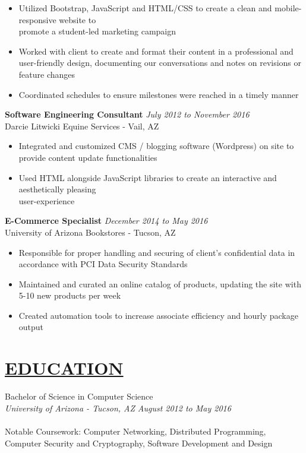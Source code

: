 \documentclass[10pt]{res} %
\begin{document}
\begin{resume}
   \begin{itemize} %
   \item Utilized Bootstrap, JavaScript and HTML/CSS to create a clean and mobile-responsive website to \\ promote a student-led marketing campaign
   \item Worked with client to create and format their content in a professional and user-friendly design, documenting our conversations and notes on revisions or feature changes
   \item Coordinated schedules to ensure milestones were reached in a timely manner
   \end{itemize}

  {\bf Software Engineering Consultant} \hfill  {\sl July 2012 to November 2016}\\
  Darcie Litwicki Equine Services - Vail, AZ
  
   \begin{itemize} %
   \item Integrated and customized CMS / blogging software (Wordpress) on site to provide content update functionalities
   \item Used HTML alongside JavaScript libraries to create an interactive and aesthetically pleasing \\ user-experience
   \end{itemize}
   
   
  {\bf E-Commerce Specialist} \hfill  {\sl December 2014 to May 2016}\\
  University of Arizona Bookstores - Tucson, AZ
  
   \begin{itemize} %
   \item Responsible for proper handling and securing of client’s confidential data in accordance with PCI Data Security Standards
   \item Maintained and curated an online catalog of products, updating the site with 5-10 new products per week
   \item Created automation tools to increase associate efficiency and hourly package output
   \end{itemize}
 
\section{\underline{EDUCATION}}
\vspace{4pt}
    Bachelor of Science in Computer Science \\
    {\sl University of Arizona - Tucson, AZ} \hfill    {\sl August 2012 to May 2016}\\
    \\
    Notable Coursework: Computer Networking, Distributed Programming, Computer Security and Cryptography, Software Development and Design
    

\end{resume}
\end{document}
